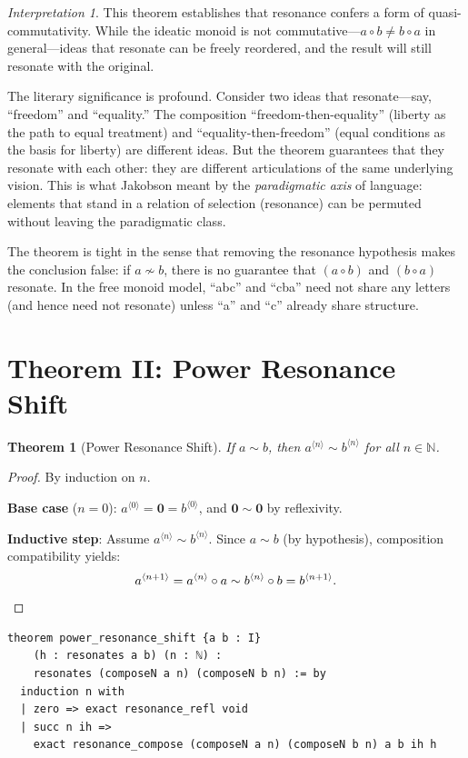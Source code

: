 \documentclass[11pt,openany]{book}
\theoremstyle{definition}
\theoremstyle{plain}
\newtheorem{theorem}[axiom]{Theorem}
\theoremstyle{remark}
\newtheorem{interpretation}[axiom]{Interpretation}
\newcommand{\compose}{\circ}                 %
\newcommand{\void}{\mathbf{0}}              %
\newcommand{\res}{\sim}                      %
\newcommand{\compN}[2]{#1^{\langle #2 \rangle}} %
\begin{document}
\begin{interpretation}
This theorem establishes that resonance confers a form of quasi-commutativity. While the ideatic monoid is not commutative---$a \compose b \neq b \compose a$ in general---ideas that resonate can be freely reordered, and the result will still resonate with the original.

The literary significance is profound. Consider two ideas that resonate---say, ``freedom'' and ``equality.'' The composition ``freedom-then-equality'' (liberty as the path to equal treatment) and ``equality-then-freedom'' (equal conditions as the basis for liberty) are different ideas. But the theorem guarantees that they resonate with each other: they are different articulations of the same underlying vision. This is what Jakobson meant by the \emph{paradigmatic axis} of language: elements that stand in a relation of selection (resonance) can be permuted without leaving the paradigmatic class.

The theorem is tight in the sense that removing the resonance hypothesis makes the conclusion false: if $a \not\res b$, there is no guarantee that $(a \compose b)$ and $(b \compose a)$ resonate. In the free monoid model, ``abc'' and ``cba'' need not share any letters (and hence need not resonate) unless ``a'' and ``c'' already share structure.
\end{interpretation}

\section{Theorem II: Power Resonance Shift}

\begin{theorem}[Power Resonance Shift]
\label{thm:key-power-res}
If $a \res b$, then $\compN{a}{n} \res \compN{b}{n}$ for all $n \in \mathbb{N}$.
\end{theorem}

\begin{proof}
By induction on $n$.

\textbf{Base case} ($n = 0$): $\compN{a}{0} = \void = \compN{b}{0}$, and $\void \res \void$ by reflexivity.

\textbf{Inductive step}: Assume $\compN{a}{n} \res \compN{b}{n}$. Since $a \res b$ (by hypothesis), composition compatibility yields:
\[
\compN{a}{n+1} = \compN{a}{n} \compose a \res \compN{b}{n} \compose b = \compN{b}{n+1}. \qedhere
\]
\end{proof}

\begin{lstlisting}
theorem power_resonance_shift {a b : I}
    (h : resonates a b) (n : ℕ) :
    resonates (composeN a n) (composeN b n) := by
  induction n with
  | zero => exact resonance_refl void
  | succ n ih =>
    exact resonance_compose (composeN a n) (composeN b n) a b ih h
\end{lstlisting}
\end{document}
